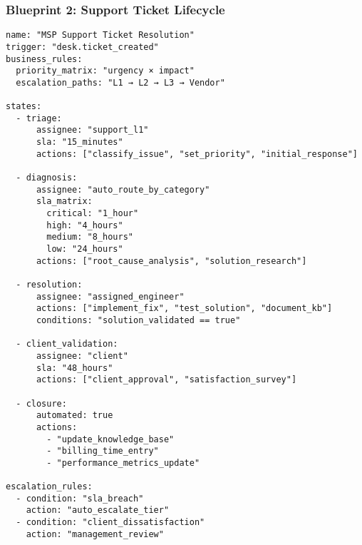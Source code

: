 \subsubsection{Blueprint 2: Support Ticket Lifecycle}
\begin{verbatim}
name: "MSP Support Ticket Resolution"
trigger: "desk.ticket_created"
business_rules:
  priority_matrix: "urgency × impact"
  escalation_paths: "L1 → L2 → L3 → Vendor"
  
states:
  - triage:
      assignee: "support_l1"
      sla: "15_minutes"
      actions: ["classify_issue", "set_priority", "initial_response"]
      
  - diagnosis:
      assignee: "auto_route_by_category" 
      sla_matrix:
        critical: "1_hour"
        high: "4_hours"
        medium: "8_hours"
        low: "24_hours"
      actions: ["root_cause_analysis", "solution_research"]
      
  - resolution:
      assignee: "assigned_engineer"
      actions: ["implement_fix", "test_solution", "document_kb"]
      conditions: "solution_validated == true"
      
  - client_validation:
      assignee: "client"
      sla: "48_hours"
      actions: ["client_approval", "satisfaction_survey"]
      
  - closure:
      automated: true
      actions:
        - "update_knowledge_base"
        - "billing_time_entry"
        - "performance_metrics_update"

escalation_rules:
  - condition: "sla_breach"
    action: "auto_escalate_tier"
  - condition: "client_dissatisfaction"
    action: "management_review"
\end{verbatim}

